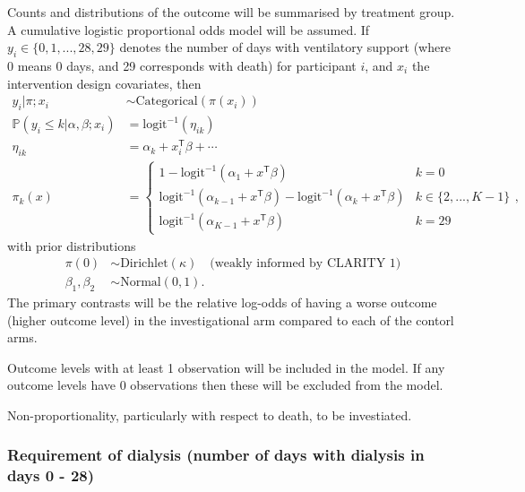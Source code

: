 \documentclass[11pt,parskip=half-]{scrartcl}
\begin{document}
Counts and distributions of the outcome will be summarised by treatment group. A cumulative logistic proportional odds model will be assumed. If $y_i\in\{0,1,...,28,29\}$ denotes the number of days with ventilatory support (where 0 means 0 days, and 29 corresponds with death) for participant $i$, and $x_i$ the intervention design covariates, then
$$
    \begin{aligned}
        y_{i} | \pi;x_i                            & \sim \text{Categorical}(\pi(x_i))           \\
        \mathbb P(y_i \leq k | \alpha, \beta; x_i) & = \text{logit}^{-1}(\eta_{ik})              \\
        \eta_{ik}                                  & = \alpha_k + x_i^{\mathsf{T}}\beta + \cdots \\
        \pi_k(x)                                   & = \begin{cases}
            1 - \text{logit}^{-1}(\alpha_1 + x^\mathsf{T}\beta)                                                     & k=0               \\
            \text{logit}^{-1}(\alpha_{k-1} + x^\mathsf{T}\beta) - \text{logit}^{-1}(\alpha_{k} + x^\mathsf{T}\beta) & k\in\{2,...,K-1\} \\
            \text{logit}^{-1}(\alpha_{K-1} + x^\mathsf{T}\beta)                                                     & k=29
        \end{cases},
    \end{aligned}
$$
with prior distributions
$$
    \begin{aligned}
        \pi(0)          & \sim \text{Dirichlet}(\kappa) \quad \text{(weakly informed by CLARITY 1)} \\
        \beta_1,\beta_2 & \sim \text{Normal}(0, 1).
    \end{aligned}
$$
The primary contrasts will be the relative log-odds of having a worse outcome (higher outcome level) in the investigational arm compared to each of the contorl arms.

Outcome levels with at least 1 observation will be included in the model. If any outcome levels have 0 observations then these will be excluded from the model.

Non-proportionality, particularly with respect to death, to be investiated.

\subsubsection{Requirement of dialysis (number of days with dialysis in days 0 - 28)}
\end{document}

